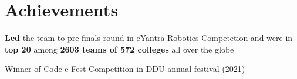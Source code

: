 \documentclass[letterpaper,11pt]{article}
\makeatletter
\newcommand{\resumeItem}[1]{
  \item\small{
    {#1 \vspace{-2pt}}
  }
}
\newcommand{\resumeSubheading}[4]{
  \vspace{-2pt}\item
    \begin{tabular*}{1.0\textwidth}[t]{l@{\extracolsep{\fill}}r}
      \textbf{#1} & \textbf{\small #2} \\
      \textit{\small#3} & \textit{\small #4} \\
    \end{tabular*}\vspace{-7pt}
}
\newcommand{\resumeSubHeadingListStart}{\begin{itemize}[leftmargin=0.0in, label={}]}
\newcommand{\resumeSubHeadingListEnd}{\end{itemize}}
\newcommand{\resumeItemListStart}{\begin{itemize}}
\newcommand{\resumeItemListEnd}{\end{itemize}\vspace{-5pt}}
\makeatother
\begin{document}

\section{Achievements}
 \begin{itemize}[leftmargin=0.15in]
    \small{\setlength{\itemsep}{-3pt}
        \item{\textbf{Led} the team to pre-finals round in eYantra Robotics Competetion and were in \textbf{top 20} among \textbf{2603 teams of 572 colleges} all over the globe}
        \item{Winner of Code-e-Fest Competition in DDU annual festival (2021)}
    }
 \end{itemize}
\end{document}
